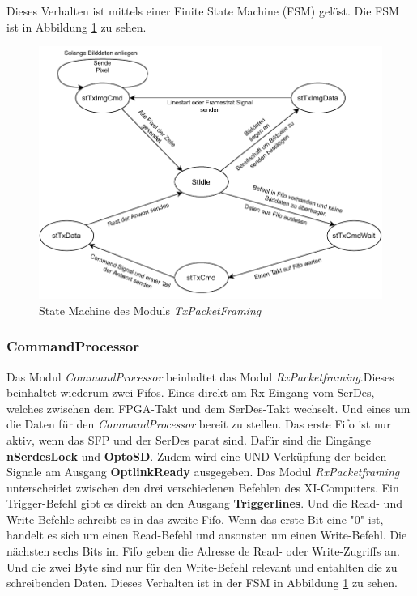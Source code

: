 \documentclass{article}
\begin{document}
Dieses Verhalten ist mittels einer Finite State Machine (FSM) gelöst. Die FSM ist in Abbildung \ref{fig:fsm_tx_packet_framing} zu sehen.

\begin{figure}[tb]
    \includegraphics[width=\linewidth]{drawio/fsm_tx_packet_framing}
    \caption{State Machine des Moduls \textit{TxPacketFraming}}
    \label{fig:fsm_tx_packet_framing}
\end{figure}

\subsubsection*{CommandProcessor}
Das Modul \textit{CommandProcessor} beinhaltet das Modul \textit{RxPacketframing}.Dieses beinhaltet wiederum zwei Fifos. Eines direkt am Rx-Eingang vom SerDes, welches zwischen dem FPGA-Takt und dem SerDes-Takt wechselt. Und eines um die Daten für den \textit{CommandProcessor} bereit zu stellen. Das erste Fifo ist nur aktiv, wenn das SFP und der SerDes parat sind. Dafür sind die Eingänge \textbf{nSerdesLock} und \textbf{OptoSD}. Zudem wird eine UND-Verküpfung der beiden Signale am Ausgang \textbf{OptlinkReady} ausgegeben. Das Modul \textit{RxPacketframing} unterscheidet zwischen den drei verschiedenen Befehlen des XI-Computers. Ein Trigger-Befehl gibt es direkt an den Ausgang \textbf{Triggerlines}. Und die Read- und Write-Befehle schreibt es in das zweite Fifo. Wenn das erste Bit eine "0" ist, handelt es sich um einen Read-Befehl und ansonsten um einen Write-Befehl. Die nächsten sechs Bits im Fifo geben die Adresse de Read- oder Write-Zugriffs an. Und die zwei Byte sind nur für den Write-Befehl relevant und entahlten die zu schreibenden Daten. Dieses Verhalten ist in der FSM in Abbildung \ref{fig:fsm_tx_packet_framing} zu sehen.
\end{document}
